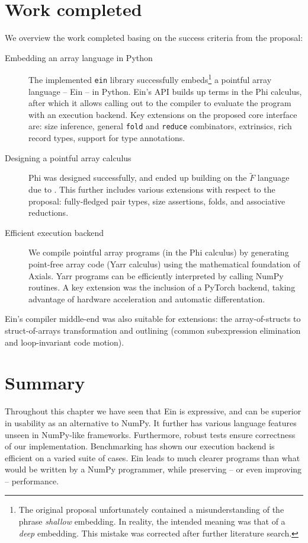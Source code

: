 \newpage
\section{Work completed}

We overview the work completed basing on the success criteria from the proposal: \begin{description}
    \item[Embedding an array language in Python] The implemented \texttt{ein} library successfully embeds\footnote{The original proposal unfortunately contained a misunderstanding of the phrase \textit{shallow} embedding. In reality, the intended meaning was that of a \textit{deep} embedding. This mistake was corrected after further literature search.} a pointful array language -- Ein -- in Python. Ein's API builds up terms in the Phi calculus, after which it allows calling out to the compiler to evaluate the program with an execution backend. Key extensions on the proposed core interface are: size inference, general \texttt{fold} and \texttt{reduce} combinators, extrinsics, rich record types, support for type annotations.
    \item[Designing a pointful array calculus] Phi was designed successfully, and ended up building on the $\tilde F$ language due to \textcite{shaikhha2019efficient}. This further includes various extensions with respect to the proposal: fully-fledged pair types, size assertions, folds, and associative reductions.
    \item[Efficient execution backend] We compile pointful array programs (in the Phi calculus) by generating point-free array code (Yarr calculus) using the mathematical foundation of Axials. Yarr programs can be efficiently interpreted by calling NumPy routines. A key extension was the inclusion of a PyTorch backend, taking advantage of hardware acceleration and automatic differentation.
\end{description}
Ein's compiler middle-end was also suitable for extensions: the array-of-structs to struct-of-arrays transformation and outlining (common subexpression elimination and loop-invariant code motion).

\section{Summary}

Throughout this chapter we have seen that Ein is expressive, and can be superior in usability as an alternative to NumPy. 
It further has various language features unseen in NumPy-like frameworks.
Furthermore, robust tests ensure correctness of our implementation. 
Benchmarking has shown our execution backend is efficient on a varied suite of cases. 
Ein leads to much clearer programs than what would be written by a NumPy programmer, while preserving -- or even improving -- performance. 
